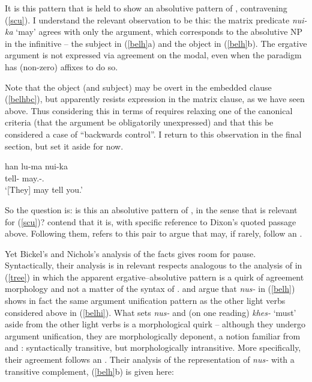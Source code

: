 \documentclass[output=paper]{langsci/langscibook}
\begin{document}
It is this pattern that is held to show an absolutive pattern of ,
contravening (\ref{scu}). I understand the relevant observation to be this: the
matrix predicate \emph{nui-ka} `may' agrees with only the \Ssg{} argument,
which corresponds to the absolutive NP in the infinitive -- the subject in
(\ref{belh}a) and the object in (\ref{belh}b). The ergative argument is not
expressed via agreement on the modal, even when the paradigm has (non-zero)
affixes to do so.

Note that the object (and subject) may be overt in the embedded clause
(\ref{belhbc}), but apparently resists expression in the matrix clause, as we
have seen above. Thus considering this in terms of  requires relaxing
one of the canonical criteria (that the argument be obligatorily unexpressed)
and that this be considered a case of \enquote{backwards control}. I return to
this observation in the final section, but set it aside for now.

\ea \label{belhbc}
       \gll han lu-ma nui-ka \\
       \Second{} tell-\Inf{} may.\Npst-\Second.\Su{} \\
	\glt `[They] may tell you.' \citep[156]{bickel04}
\z

So the question is: is this an absolutive pattern of , in the sense that
is relevant for (\ref{scu})? \citet{bicknich01} contend that it is, with
specific reference to Dixon's quoted passage above. Following them,
\citet{malchukov14} refers to this pair to argue that  may, if rarely,
follow an .

Yet Bickel's and Nichols's analysis of the facts gives room for pause.
Syntactically, their analysis is in relevant respects analogous to the analysis
of  in (\ref{tree}) in which the apparent ergative--absolutive
pattern is a quirk of agreement morphology and not a matter of the syntax of
.  \citet{bickel04} and \citet{bicknich01} argue that \emph{nus-}
in (\ref{belh}) shows in fact the same argument unification pattern as the
other light verbs considered above in (\ref{belhi}). What sets \emph{nus-} and
(on one reading) \emph{khes-} `must' aside from the other light verbs is a
morphological quirk -- although they undergo argument unification, they are
morphologically deponent, a notion familiar from  and 
\citep{baermanetal07}: syntactically transitive, but morphologically
intransitive. More specifically, their agreement follows an . Their analysis of the representation of \emph{nus-} with a
transitive complement, (\ref{belh}b) is given here:
\end{document}

